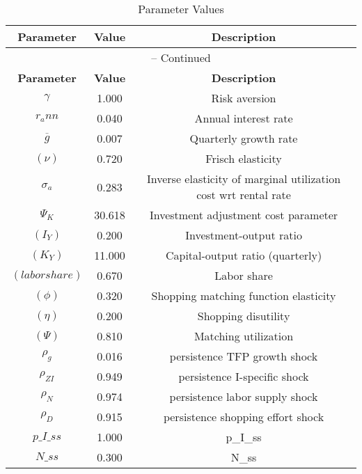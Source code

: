 \begin{center}
\begin{longtable}{ccc}
\caption{Parameter Values}\\%
\toprule%
\multicolumn{1}{c}{\textbf{Parameter}} &
\multicolumn{1}{c}{\textbf{Value}} &
 \multicolumn{1}{c}{\textbf{Description}}\\%
\midrule%
\endfirsthead
\multicolumn{3}{c}{{\tablename} \thetable{} -- Continued}\\%
\midrule%
\multicolumn{1}{c}{\textbf{Parameter}} &
\multicolumn{1}{c}{\textbf{Value}} &
  \multicolumn{1}{c}{\textbf{Description}}\\%
\midrule%
\endhead
${\gamma}$ 	 & 	 1.000 	 & 	 Risk aversion\\
${r_ann}$ 	 & 	 0.040 	 & 	 Annual interest rate\\
${\overline{g}}$ 	 & 	 0.007 	 & 	 Quarterly growth rate\\
$(\nu)$ 	 & 	 0.720 	 & 	 Frisch elasticity\\
${\sigma_a}$ 	 & 	 0.283 	 & 	 Inverse elasticity of marginal utilization cost wrt rental rate\\
${\Psi_K}$ 	 & 	 30.618 	 & 	 Investment adjustment cost parameter\\
$(I_Y)$ 	 & 	 0.200 	 & 	 Investment-output ratio\\
$(K_Y)$ 	 & 	 11.000 	 & 	 Capital-output ratio (quarterly)\\
$(labor share)$ 	 & 	 0.670 	 & 	 Labor share\\
$(\phi)$ 	 & 	 0.320 	 & 	 Shopping matching function elasticity\\
$(\eta)$ 	 & 	 0.200 	 & 	 Shopping disutility\\
$(\Psi)$ 	 & 	 0.810 	 & 	 Matching utilization\\
${\rho_g}$ 	 & 	 0.016 	 & 	 persistence TFP growth shock\\
${\rho_{ZI}}$ 	 & 	 0.949 	 & 	 persistence I-specific shock\\
${\rho_N}$ 	 & 	 0.974 	 & 	 persistence labor supply shock\\
${\rho_D}$ 	 & 	 0.915 	 & 	 persistence shopping effort shock\\
$p\_I\_ss$ 	 & 	 1.000 	 & 	 p\_I\_ss\\
$N\_ss$ 	 & 	 0.300 	 & 	 N\_ss\\
\bottomrule%
\end{longtable}
\end{center}
